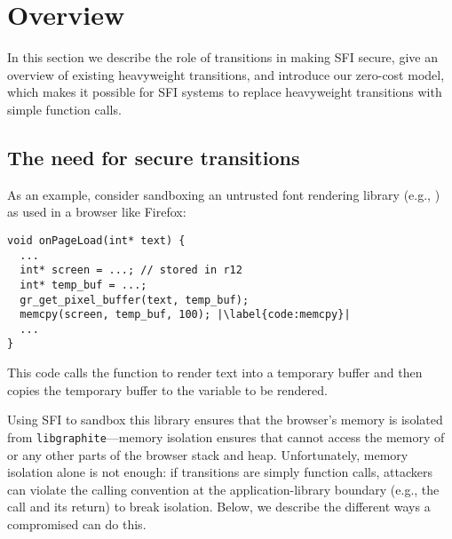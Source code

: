 \section{Overview} \label{sec:isolation}

In this section we describe the role of transitions in making SFI secure, give
an overview of existing heavyweight transitions, and introduce our zero-cost
model, which makes it possible for SFI systems to replace heavyweight
transitions with simple function calls.

\subsection{The need for secure transitions}
\label{subsec:overview-secure}

As an example, consider sandboxing an untrusted font rendering library (e.g.,
\libgraphite) as used in a browser like Firefox:
%
\begin{lstlisting}[style=C, escapeinside=||]
void onPageLoad(int* text) {
  ...
  int* screen = ...; // stored in r12
  int* temp_buf = ...;
  gr_get_pixel_buffer(text, temp_buf);
  memcpy(screen, temp_buf, 100); |\label{code:memcpy}|
  ...
}
\end{lstlisting}
This code calls the \libgraphite {} function to
render text into a temporary buffer and then copies the temporary buffer to the
variable  to be rendered.

\sloppy
Using SFI to sandbox this library ensures that the browser's memory is isolated
from \texttt{libgraphite}\dash---memory isolation ensures that
 cannot access the memory of 
or any other parts of the browser stack and heap.
%
Unfortunately, memory isolation alone is not enough:
%
if transitions are simply function calls, attackers can violate the calling
convention at the application-library boundary (e.g., the
 call and its return) to break isolation.
%
Below, we describe the different ways a compromised \libgraphite can do this.


